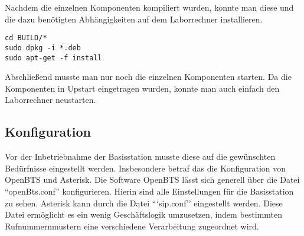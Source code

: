 Nachdem die einzelnen Komponenten kompiliert wurden, konnte man diese und die dazu benötigten Abhängigkeiten auf dem Laborrechner installieren.

\begin{lstlisting}
cd BUILD/*
sudo dpkg -i *.deb
sudo apt-get -f install
\end{lstlisting}

Abschließend musste man nur noch die einzelnen Komponenten starten. Da die Komponenten in Upstart eingetragen wurden, konnte man auch einfach den Laborrechner neustarten.

\subsection{Konfiguration}
\label{sec:konfiguration}
Vor der Inbetriebnahme der Basisstation musste diese auf die gewünschten Bedürfnisse eingestellt werden. Insbesondere betraf das die Konfiguration von OpenBTS und Asterisk. Die Software OpenBTS lässt sich generell über die Datei ``openBts.conf'' konfigurieren. Hierin sind alle Einstellungen für die Basisstation zu sehen. Asterisk kann durch die Datei ```sip.conf'' eingestellt werden. Diese Datei ermöglicht es ein wenig Geschäftslogik umzusetzen, indem bestimmten Rufnummernmustern eine verschiedene Verarbeitung zugeordnet wird. \\

